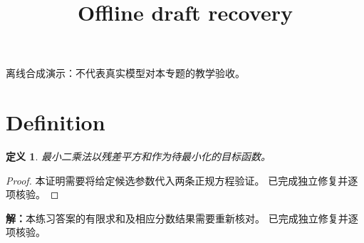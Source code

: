 \documentclass[UTF8,fontset=fandol,11pt]{ctexart}
\title{Offline draft recovery}
\date{}
\newtheorem{definition}{定义}[section]
\begin{document}
\maketitle
\par\noindent 离线合成演示：不代表真实模型对本专题的教学验收。\par
\section{Definition}\label{sec:S01}
\begin{definition}
最小二乘法以残差平方和作为待最小化的目标函数。
\end{definition}
\begin{proof}
本证明需要将给定候选参数代入两条正规方程验证。 已完成独立修复并逐项核验。
\end{proof}
\par\noindent\textbf{解：}本练习答案的有限求和及相应分数结果需要重新核对。 已完成独立修复并逐项核验。\par
\end{document}
